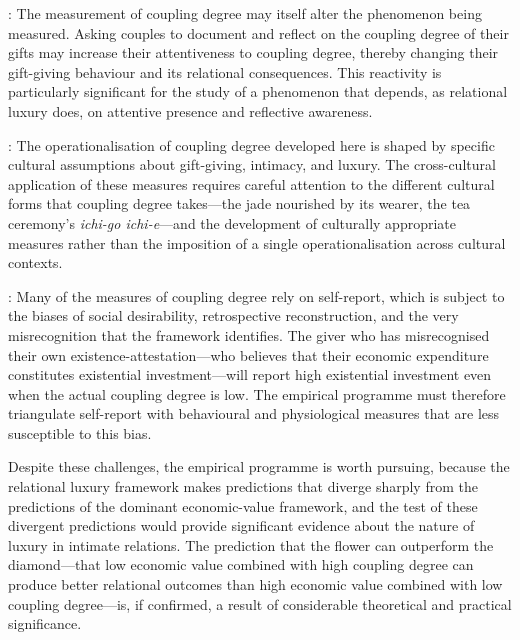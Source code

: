 : The measurement of coupling degree may itself alter the phenomenon being measured. Asking couples to document and reflect on the coupling degree of their gifts may increase their attentiveness to coupling degree, thereby changing their gift-giving behaviour and its relational consequences. This reactivity is particularly significant for the study of a phenomenon that depends, as relational luxury does, on attentive presence and reflective awareness.

: The operationalisation of coupling degree developed here is shaped by specific cultural assumptions about gift-giving, intimacy, and luxury. The cross-cultural application of these measures requires careful attention to the different cultural forms that coupling degree takes---the jade nourished by its wearer, the tea ceremony's \emph{ichi-go ichi-e}---and the development of culturally appropriate measures rather than the imposition of a single operationalisation across cultural contexts.

: Many of the measures of coupling degree rely on self-report, which is subject to the biases of social desirability, retrospective reconstruction, and the very misrecognition that the framework identifies. The giver who has misrecognised their own existence-attestation---who believes that their economic expenditure constitutes existential investment---will report high existential investment even when the actual coupling degree is low. The empirical programme must therefore triangulate self-report with behavioural and physiological measures that are less susceptible to this bias.

Despite these challenges, the empirical programme is worth pursuing, because the relational luxury framework makes predictions that diverge sharply from the predictions of the dominant economic-value framework, and the test of these divergent predictions would provide significant evidence about the nature of luxury in intimate relations. The prediction that the flower can outperform the diamond---that low economic value combined with high coupling degree can produce better relational outcomes than high economic value combined with low coupling degree---is, if confirmed, a result of considerable theoretical and practical significance.
